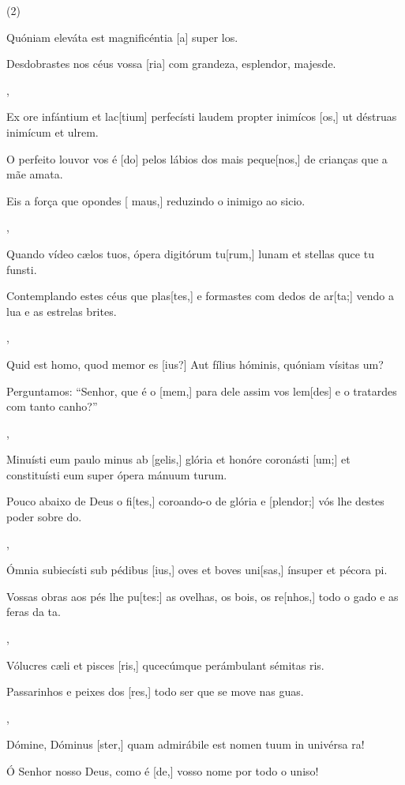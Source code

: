 \SetVersePairs(2){
  {\item {}Quóniam eleváta est magnificéntia [a] super \-los.~\Responsorium}%
    {\item {}Desdobrastes nos céus vossa [ria] com grandeza, esplendor, majesde.~\Responsorium},
  {\item {}Ex ore infántium et lac[tium] perfecísti laudem propter inimícos [os,] ut déstruas inimícum et ul\-\-rem.~\Responsorium}%
    {\item {}O perfeito louvor vos é [do] pelos lábios dos mais peque[nos,] de crianças que a mãe ama\-ta.~\Responsorium
    \item {}Eis a força que opondes [ maus,] reduzindo o inimigo ao sicio.~\Responsorium},
  {\item {}Quando vídeo cælos tuos, ópera digitórum tu[\-rum,] lunam et stellas quce tu funsti.~\Responsorium}%
    {\item {}Contemplando estes céus que plas[tes,] e formastes com dedos de ar[ta;] vendo a lua e as estrelas brites.~\Responsorium},
  {\item {}Quid est homo, quod memor es [ius?] Aut fílius hóminis, quóniam vísitas um?~\Responsorium}%
    {\item {}Perguntamos: ``Senhor, que é o [mem,] para dele assim vos lem[des] e o tratardes com tanto canho?''~\Responsorium},
  {\item {}Minuísti eum paulo minus ab [gelis,] glória et honóre coronásti [um;] et constituísti eum super ópera mánuum turum.~\Responsorium}%
    {\item {}Pouco abaixo de Deus o fi[tes,] coroando-o de glória e [plendor;] vós lhe destes poder sobre do.~\Responsorium},
  {\item {}Ómnia subiecísti sub pédibus [ius,] oves et boves uni[\-sas,] ínsuper et pécora pi.~\Responsorium}%
    {\item {}Vossas obras aos pés lhe pu[tes:] as ovelhas, os bois, os re[nhos,] todo o gado e as feras da ta.~\Responsorium},
  {\item {}Vólucres cæli et pisces [ris,] qucecúmque perámbulant sémitas ris.~\Responsorium}%
    {\item {}Passarinhos e peixes dos [res,] todo ser que se move nas guas.~\Responsorium},
  {\item {}Dómine, Dóminus [ster,] quam admirábile est nomen tuum in univérsa ra!~\Responsorium}%
    {\item {}Ó Senhor nosso Deus, como é [de,] vosso nome por todo o uniso!~\Responsorium}
}
